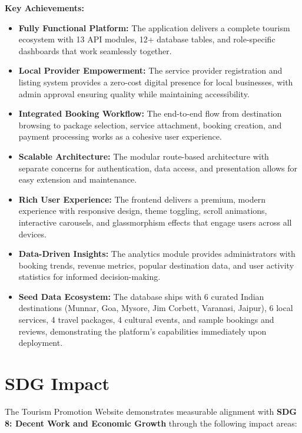 \textbf{Key Achievements:}
\begin{itemize}[leftmargin=2em]
    \item \textbf{Fully Functional Platform:} The application delivers a complete tourism ecosystem with 13 API modules, 12+ database tables, and role-specific dashboards that work seamlessly together.

    \item \textbf{Local Provider Empowerment:} The service provider registration and listing system provides a zero-cost digital presence for local businesses, with admin approval ensuring quality while maintaining accessibility.

    \item \textbf{Integrated Booking Workflow:} The end-to-end flow from destination browsing to package selection, service attachment, booking creation, and payment processing works as a cohesive user experience.

    \item \textbf{Scalable Architecture:} The modular route-based architecture with separate concerns for authentication, data access, and presentation allows for easy extension and maintenance.

    \item \textbf{Rich User Experience:} The frontend delivers a premium, modern experience with responsive design, theme toggling, scroll animations, interactive carousels, and glassmorphism effects that engage users across all devices.

    \item \textbf{Data-Driven Insights:} The analytics module provides administrators with booking trends, revenue metrics, popular destination data, and user activity statistics for informed decision-making.

    \item \textbf{Seed Data Ecosystem:} The database ships with 6 curated Indian destinations (Munnar, Goa, Mysore, Jim Corbett, Varanasi, Jaipur), 6 local services, 4 travel packages, 4 cultural events, and sample bookings and reviews, demonstrating the platform's capabilities immediately upon deployment.
\end{itemize}

\section{SDG Impact}

The Tourism Promotion Website demonstrates measurable alignment with \textbf{SDG 8: Decent Work and Economic Growth} through the following impact areas:

